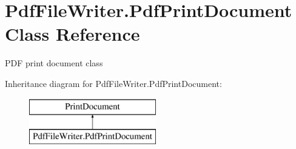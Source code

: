 \hypertarget{class_pdf_file_writer_1_1_pdf_print_document}{}\section{Pdf\+File\+Writer.\+Pdf\+Print\+Document Class Reference}
\label{class_pdf_file_writer_1_1_pdf_print_document}


P\+DF print document class  


Inheritance diagram for Pdf\+File\+Writer.\+Pdf\+Print\+Document\+:\begin{figure}[H]
\begin{center}
\leavevmode
\includegraphics[height=2.000000cm]{class_pdf_file_writer_1_1_pdf_print_document}
\end{center}
\end{figure}
